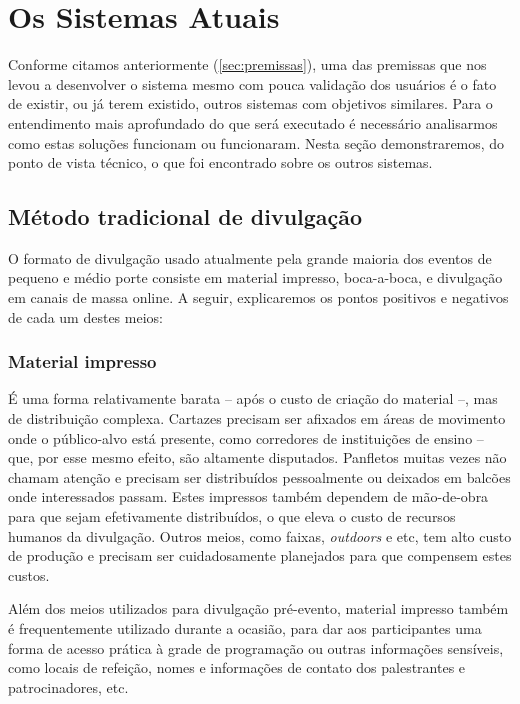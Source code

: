 \documentclass[12pt,a4paper,twoside,hyphens,english,brazil]{abntex2}
\begin{document}
\chapter{Os Sistemas Atuais}
Conforme citamos anteriormente (\autoref{sec:premissas}), uma das premissas que nos levou a desenvolver o sistema mesmo com pouca validação dos usuários é o fato de existir, ou já terem existido, outros sistemas com objetivos similares.
Para o entendimento mais aprofundado do que será executado é necessário analisarmos como estas soluções funcionam ou funcionaram. Nesta seção demonstraremos, do ponto de vista técnico, o que foi encontrado sobre os outros sistemas.

\section{Método tradicional de divulgação} \label{sec:sistemas:tradicional}
O formato de divulgação usado atualmente pela grande maioria dos eventos de pequeno e médio porte consiste em material impresso, boca-a-boca, e divulgação em canais de massa online. A seguir, explicaremos os pontos positivos e negativos de cada um destes meios:

\subsection*{Material impresso}
É uma forma relativamente barata -- após o custo de criação do material --, mas de distribuição complexa. Cartazes precisam ser afixados em áreas de movimento onde o público-alvo está presente, como corredores de instituições de ensino -- que, por esse mesmo efeito, são altamente disputados. Panfletos muitas vezes não chamam atenção e precisam ser distribuídos pessoalmente ou deixados em balcões onde interessados passam.  Estes impressos também dependem de mão-de-obra para que sejam efetivamente distribuídos, o que eleva o custo de recursos humanos da divulgação.
Outros meios, como faixas, \emph{outdoors} e etc, tem alto custo de produção e precisam ser cuidadosamente planejados para que compensem estes custos.

Além dos meios utilizados para divulgação pré-evento, material impresso também é frequentemente utilizado durante a ocasião, para dar aos participantes uma forma de acesso prática à grade de programação ou outras informações sensíveis, como locais de refeição, nomes e informações de contato dos palestrantes e patrocinadores, etc.
\end{document}
